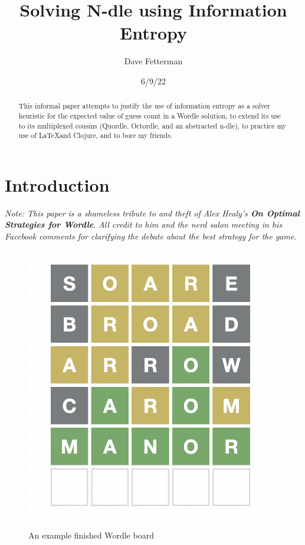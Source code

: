 \documentclass[11pt, oneside]{article} 	%
\title{Solving N-dle using Information Entropy}
\author{Dave Fetterman}
\affil{Obviously Unemployed}
\date{6/9/22}							%
\begin{document}
\maketitle

\begin{abstract}

This informal paper attempts to justify the use of information entropy as a solver heuristic for the expected value of guess count in a Wordle solution, to extend its use to its multiplexed cousins (Quordle, Octordle, and an abstracted n-dle), to practice my use of \LaTeX and Clojure, and to bore my friends.

\end{abstract}

\section{Introduction}

\emph{Note: This paper is a shameless tribute to and theft of Alex Healy's \textbf{On Optimal Strategies for Wordle}}\cite{1}. \emph{All credit to him and the nerd salon meeting in his Facebook comments for clarifying the debate about the best strategy for the game}.
 
\begin{figure}
\centering
\includegraphics[scale=.3]{wordle}
\caption{An example finished Wordle board}
\end{figure}
\end{document}
